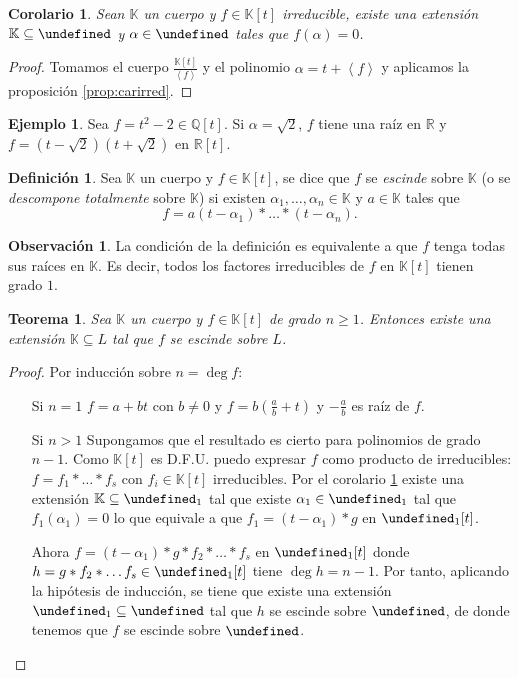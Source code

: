 \documentclass[10pt, spanish]{report}
\newtheorem{tma}{Teorema}[chapter]
\newtheorem{cor}{Corolario}[tma]
\theoremstyle{definition}
\newtheorem*{defin}{Definición}
\newtheorem*{ej}{Ejemplo}
\newtheorem*{obs}{Observación}
\newcommand{\Q}{\mathbb{Q}}
\newcommand{\R}{\mathbb{R}}
\newcommand{\K}{\mathbb{K}}
\let\L\undefined
\newcommand{\L}{\mathbb{L}}
\renewcommand{\geq}{\geqslant}
\begin{document}
\begin{cor}\label{cor:existenciaextension}
    Sean $\K$ un cuerpo y $f\in\K[t]$ irreducible, existe una extensión
    $\K\subseteq\L$ y $\alpha\in\L$ tales que $f(\alpha)=0$.
\end{cor}

\begin{proof}
    Tomamos el cuerpo $\frac{\K[t]}{\left< f \right> }$ y el polinomio
    $\alpha=t+\left< f \right>$  y aplicamos la proposición
    \ref{prop:carirred}.
\end{proof}

\begin{ej}
    Sea $f=t^2-2\in \Q[t]$. Si $\alpha=\sqrt{2}$, $f$  tiene una raíz en $\R$ y
    $f=(t-\sqrt{2})(t+\sqrt{2})$ en $\R[t]$.
\end{ej}

\begin{defin}
    Sea $\K$ un cuerpo y $f\in\K[t]$, se dice que $f$ se \textit{escinde} sobre
    $\K$ (o se \textit{descompone totalmente} sobre $\K$) si existen $\alpha_1,
    \ldots,\alpha_n\in\K$ y $a\in\K$ tales que
    \[f=a(t-\alpha_1)*\ldots*(t-\alpha_n).\]
\end{defin}

\begin{obs}
    La condición de la definición es equivalente a que $f$ tenga todas sus
    raíces en $\K$. Es decir, todos los factores irreducibles de $f$ en $\K[t]$
    tienen grado $1$.
\end{obs}

\begin{tma}
    Sea $\K$ un cuerpo y $f\in\K[t]$ de grado $n\geq1$. Entonces existe una
    extensión $\K\subseteq L$ tal que $f$ se escinde sobre $L$.
\end{tma}

\begin{proof}
    Por inducción sobre $n=\deg{f}$:
    \begin{itemize}[itemindent=30pt]
        \item[Si $n=1$] $f=a+bt$ con $b\neq 0$ y $f=b(\frac{a}{b}+t)$ y
            $-\frac{a}{b}$ es raíz de $f$.
        \item[Si $n>1$] Supongamos que el resultado es cierto para polinomios de
            grado $n-1$. Como $\K[t]$ es D.F.U. puedo expresar $f$
            como producto de irreducibles: $f=f_1*\ldots*f_s$ con $f_i\in\K[t]$
            irreducibles. Por el corolario \ref{cor:existenciaextension}
            existe una extensión $\K\subseteq\L_1$ tal que existe
            $\alpha_1\in\L_1$ tal que $f_1(\alpha_1)=0$ lo que equivale a que
            $f_1=(t-\alpha_1)*g$ en $\L_1[t]$.

            Ahora $f=(t-\alpha_1)*g*f_2*\ldots*f_s$ en $\L_1[t]$ donde
            $h=g*f_2*\ldots f_s\in\L_1[t]$ tiene $\deg{h}=n-1$. Por tanto,
            aplicando la hipótesis de inducción, se tiene que existe una
            extensión $\L_1\subseteq\L$ tal que $h$ se escinde sobre $\L$, de
            donde tenemos que $f$ se escinde sobre $\L$.
    \end{itemize}
    \vspace{-1.75em}
\end{proof}
\end{document}
